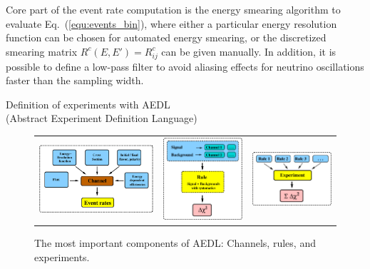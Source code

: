 \documentclass[12pt,a4paper]{article}
\makeatletter
\renewcommand{\section}{\@startsection{section}{1}{0em}{-\baselineskip}%
{\baselineskip}{\normalfont\large\bfseries}}
\newcommand{\eq}{Eq.}
\newcommand{\AEDL}{{\sf AEDL}}
\newcommand{\equ}[1]{\eq~(\ref{equ:#1})}
\makeatother
\begin{document}
Core part of the event rate computation is the energy smearing algorithm
to evaluate \equ{events_bin}, where either a particular energy resolution
 function can be chosen for automated energy smearing, or the discretized
smearing matrix $R^c(E,E') = R^c_{ij} $ can be given manually. In addition, it is possible
to define a low-pass filter to avoid aliasing effects for neutrino
oscillations faster than the sampling width.

\section{Definition of experiments with \AEDL\\ (Abstract Experiment 
Definition Language)}

\begin{figure}[t]
\begin{center}
\begin{tabular}{p{6.3cm}p{4.3cm}p{4.3cm}}
\includegraphics[width=6.5cm]{AEDL1} &
\includegraphics[width=4.5cm]{SignalBackground} &
\includegraphics[width=4.5cm]{Rules} \\
\end{tabular}
\end{center}
\caption{\label{fig:aedl} The most important components of \AEDL :
Channels, rules, and experiments.}
\end{figure}
\end{document}

